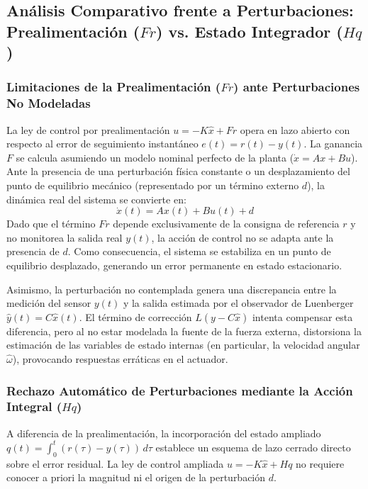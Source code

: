 \documentclass[11pt,a4paper]{article}
\begin{document}
\subsection{Análisis Comparativo frente a Perturbaciones: Prealimentación ($F r$) vs. Estado Integrador ($H q$)}

\subsubsection{Limitaciones de la Prealimentación ($F r$) ante Perturbaciones No Modeladas}
La ley de control por prealimentación $u = -K\hat{x} + F r$ opera en lazo abierto con respecto al error de seguimiento instantáneo $e(t) = r(t) - y(t)$. La ganancia $F$ se calcula asumiendo un modelo nominal perfecto de la planta ($\dot{x} = A x + B u$). Ante la presencia de una perturbación física constante o un desplazamiento del punto de equilibrio mecánico (representado por un término externo $d$), la dinámica real del sistema se convierte en:
\begin{equation}
\dot{x}(t) = A x(t) + B u(t) + d
\end{equation}
Dado que el término $F r$ depende exclusivamente de la consigna de referencia $r$ y no monitorea la salida real $y(t)$, la acción de control no se adapta ante la presencia de $d$. Como consecuencia, el sistema se estabiliza en un punto de equilibrio desplazado, generando un error permanente en estado estacionario.

Asimismo, la perturbación no contemplada genera una discrepancia entre la medición del sensor $y(t)$ y la salida estimada por el observador de Luenberger $\hat{y}(t) = C\hat{x}(t)$. El término de corrección $L(y - C\hat{x})$ intenta compensar esta diferencia, pero al no estar modelada la fuente de la fuerza externa, distorsiona la estimación de las variables de estado internas (en particular, la velocidad angular $\hat{\omega}$), provocando respuestas erráticas en el actuador.

\subsubsection{Rechazo Automático de Perturbaciones mediante la Acción Integral ($H q$)}
A diferencia de la prealimentación, la incorporación del estado ampliado $q(t) = \int_{0}^{t} (r(\tau) - y(\tau)) \, d\tau$ establece un esquema de lazo cerrado directo sobre el error residual. La ley de control ampliada $u = -K\hat{x} + H q$ no requiere conocer a priori la magnitud ni el origen de la perturbación $d$.
\end{document}
